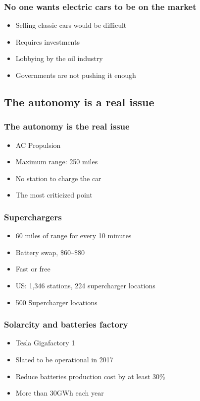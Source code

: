\begin{frame}
\frametitle{No one wants electric cars to be on the market}
\begin{itemize}
    \itemsep1.5em
    \item Selling classic cars would be difficult %
    \item Requires investments
    \item Lobbying by the oil industry  %
    \item Governments are not pushing it enough %
\end{itemize}
\end{frame}


\subsection{The autonomy is a real issue}

\begin{frame}
\frametitle{The autonomy is the real issue}
\begin{itemize}
    \itemsep1.5em
    \item AC Propulsion
    \item Maximum range: 250 miles
    \item No station to charge the car
    \item The most criticized point
\end{itemize}
\end{frame}

\begin{frame}
\frametitle{Superchargers}
\begin{itemize}
    \itemsep1.5em
    \item 60 miles of range for every 10 minutes
    \item Battery swap, \$60--\$80
    \item Fast or free
    \item US\@: 1,346 stations, 224 supercharger locations
    \item 500 Supercharger locations
\end{itemize}
\end{frame}


\begin{frame}
\frametitle{Solarcity and batteries factory}
\begin{itemize}
    \itemsep1.5em
    \item Tesla Gigafactory 1 %
    \item Slated to be operational in 2017
    \item Reduce batteries production cost by at least 30\%
    \item More than 30GWh each year
\end{itemize}
\end{frame}


